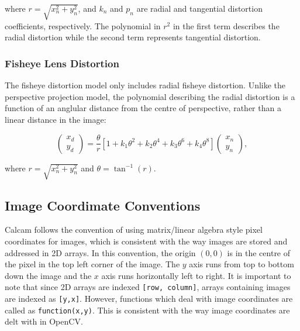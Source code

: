 \documentclass[12pt]{article}
\newcommand{\code}[1]{\texttt{#1}}
\begin{document}
\noindent where $r = \sqrt{x_n^2 + y_n^2}$, and $k_n$ and $p_n$ are radial and tangential distortion coefficients, respectively. The polynomial in $r^2$ in the first term describes the radial distortion while the second term represents tangential distortion.

\subsubsection{Fisheye Lens Distortion}

The fisheye distortion model only includes radial fisheye distortion. Unlike the perspective projection model, the polynomial describing the radial distortion is a function of an anglular distance from the centre of perspective, rather than a linear distance in the image:

\begin{equation}
\begin{pmatrix}x_d\\y_d\end{pmatrix} = \frac{\theta}{r}\left[ 1 + k_1\theta^2 + k_2\theta^4 + k_3\theta^6 + k_4\theta^8\right]\begin{pmatrix}x_n\\y_n\end{pmatrix},
\label{eqn:fisheye_distortion}
\end{equation}

\noindent where $r = \sqrt{x_n^2 + y_n^2}$ and $\theta = \tan^{-1}(r)$.


\subsection{Image Coordimate Conventions}
Calcam follows the convention of using matrix/linear algebra style pixel coordinates for images, which is consistent with the way images are stored and addressed in 2D arrays. In this convention, the origin $(0,0)$ is in the centre of the pixel in the top left corner of the image. The $y$ axis runs from top to bottom down the image and the $x$ axis runs horizontally left to right. It is important to note that since 2D arrays are indexed \code{[row, column]}, arrays containing images are indexed as \code{[y,x]}. However, functions which deal with image coordinates are called as \code{function(x,y)}. This is consistent with the way image coordinates are delt with in OpenCV.
\end{document}
